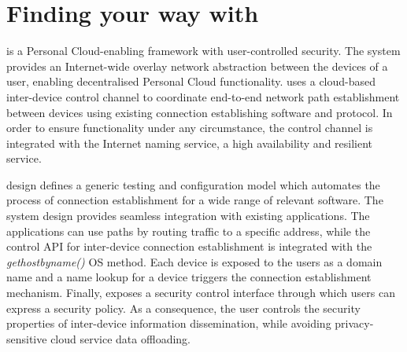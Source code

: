 % 


\section{Finding your way with \signpost}\label{sec:sp-signpost}

\signpost is a Personal Cloud-enabling framework with user-controlled security.
The system provides an Internet-wide overlay network abstraction between the
devices of a user, enabling decentralised Personal Cloud
functionality.  \signpost uses a cloud-based inter-device control channel to
coordinate end-to-end network path establishment between devices using existing
connection establishing software and protocol.  In order to ensure functionality
under any circumstance, the \signpost control channel is integrated with the
Internet naming service, a high availability and resilient service. 

\signpost design defines a generic testing and configuration model which
automates the process of connection establishment for a wide range of relevant
software.  The system design provides seamless integration with existing
applications. The applications can use \signpost paths by routing traffic to a
\signpost specific address, while the control API for inter-device connection
establishment is integrated with the \textit{gethostbyname()} OS method.  Each
device is exposed to the users as a domain name and a name lookup for a device
triggers the \signpost connection establishment mechanism. Finally, \signpost
exposes a security control interface through which users can express a security
policy. As a consequence, the user
controls the security properties of inter-device information dissemination,
while avoiding privacy-sensitive cloud service data offloading. 

